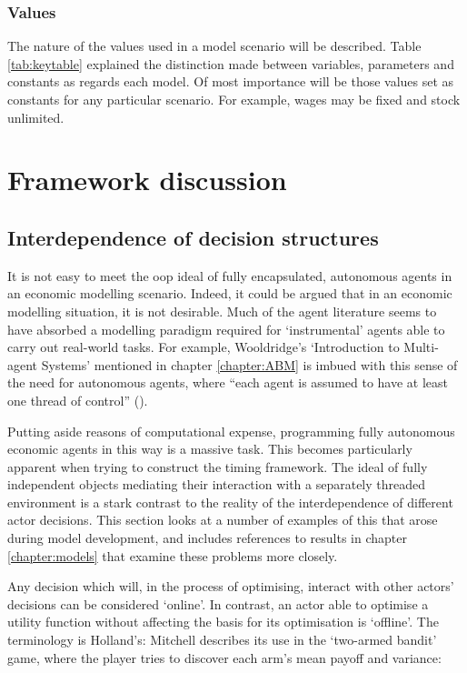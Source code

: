 \subsubsection{Values}

The nature of the values used in a model scenario will be described. Table \ref{tab:keytable} explained the distinction made between variables, parameters and constants as regards each model. Of most importance will be those values set as constants for any particular scenario. For example, wages may be fixed and stock unlimited.


\section{Framework discussion \label{sec:nutsnbolts}} 

\subsection{Interdependence of decision structures \label{sec:decstruct}}

It is not easy to meet the \gls{oop} ideal of fully encapsulated, autonomous agents in an economic modelling scenario. Indeed, it could be argued that in an economic modelling situation, it is not desirable. Much of the agent literature seems to have absorbed a modelling paradigm required for `instrumental' agents able to carry out real-world tasks. For example, Wooldridge's `Introduction to Multi-agent Systems' mentioned in chapter \ref{chapter:ABM} is imbued with this sense of the need for autonomous agents,  where ``each agent is assumed to have at least one thread of control'' (\citealt{wooldridge_introduction_2009}). 

Putting aside reasons of computational expense, programming fully autonomous economic agents in this way is a massive task. This becomes particularly apparent when trying to construct the timing framework. The ideal of fully independent objects mediating their interaction with a separately threaded environment is a stark contrast to the reality of the interdependence of different actor decisions. This section looks at a number of examples of this that arose during model development, and includes references to results in chapter \ref{chapter:models} that examine these problems more closely.

Any decision which will, in the process of optimising, interact with other actors' decisions can be considered `online'. In contrast, an actor able to optimise a utility function without affecting the basis for its optimisation is `offline'. The terminology is Holland's: Mitchell describes its use in the `two-armed bandit' game, where the player tries to discover each arm's mean payoff and variance:

